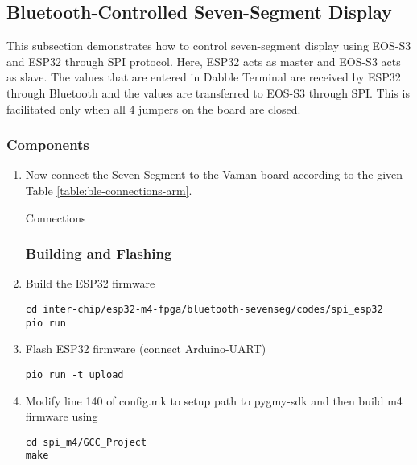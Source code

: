 \subsection{Bluetooth-Controlled Seven-Segment Display}
This subsection demonstrates how to control seven-segment display using EOS-S3 and
ESP32 through SPI protocol. Here, ESP32 acts as master and EOS-S3 acts as slave.
The values that are entered in Dabble Terminal are received by ESP32 through
Bluetooth and the values are transferred to EOS-S3 through SPI. This is 
facilitated only when all 4 jumpers on the board are closed.
\subsubsection{Components}
\begin{enumerate}[label=\thesubsection.\arabic*.,ref=\thesubsection.\theenumi]

\begin{table}[!ht]
\centering

\caption{Components}
\label{table:ble-components-arm}
\end{table}
\item Now connect the Seven Segment to the Vaman board according to the given 
Table \ref{table:ble-connections-arm}.
\begin{table}[!ht]
\centering

\caption{Connections}
\label{table:ble-connections-arm}
\end{table}

\subsubsection{Building and Flashing}
\raggedright
\item Build the ESP32 firmware
\begin{lstlisting}
cd inter-chip/esp32-m4-fpga/bluetooth-sevenseg/codes/spi_esp32
pio run
\end{lstlisting} 

\item Flash ESP32 firmware (connect Arduino-UART)
\begin{lstlisting}
pio run -t upload
\end{lstlisting} 

\item  Modify line 140 of config.mk to setup path to pygmy-sdk and then build m4
firmware using
\begin{lstlisting}
cd spi_m4/GCC_Project
make
\end{lstlisting}


\end{enumerate}

